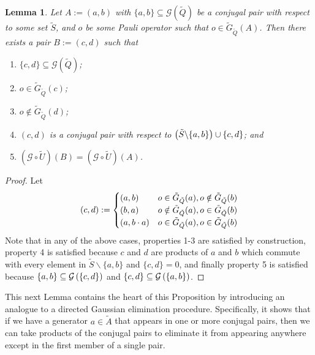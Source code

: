\documentclass[twocolumn,showpacs,preprintnumbers,amsmath,amssymb,nofootinbib,pra,floatfix]{revtex4-1}
\newtheorem{lemma}{Lemma}
\newenvironment{remark}[1][Remark]{\begin{trivlist}
\item[\hskip \labelsep {\bfseries #1}]}{\end{trivlist}}
\newcommand{\set}{\tilde}
\newcommand{\genfun}{\mathcal{G}}
\begin{document}
\begin{lemma}
\label{single-pair-rearrangement}
Let $A:=(a,b)$ with $\{a,b\}\subseteq\genfun(\set Q)$ be a conjugal pair with respect to some set $\set S$, and $o$ be some Pauli operator such that $o\in\set G_{\set Q}(A)$.  Then there exists a pair $B:=(c,d)$ such that
\begin{enumerate}
\item $\{c,d\}\subseteq\genfun(\set Q)$;
\item $o\in \set G_{\set Q}(c)$;
\item $o\notin \set G_{\set Q}(d)$;
\item $(c,d)$ is a conjugal pair with respect to $\paren{\set S\backslash \{a,b\}}\cup\{c,d\}$; and
\item $(\genfun\circ\set U)(B) = (\genfun\circ\set U)(A)$.
\end{enumerate}
\end{lemma}

\begin{proof}
Let
$$
(c,d):=
\begin{cases}
\paren{a,b} & o\in \set G_{\set Q}(a), o\notin \set G_{\set Q}(b) \\
\paren{b,a} &  o\notin \set G_{\set Q}(a), o\in \set G_{\set Q}(b) \\
\paren{a,b\cdot a} & o\in \set G_{\set Q}(a), o\in \set G_{\set Q}(b) \\
\end{cases}
$$
Note that in any of the above cases, properties 1-3 are satisfied by construction, property 4 is satisfied because $c$ and $d$ are products of $a$ and $b$ which commute with every element in $\set S\backslash \{a,b\}$ and $\{c,d\}=0$, and finally property 5 is satisfied because $\{a,b\}\subseteq \genfun\paren{\{c,d\}}$ and $\{c,d\}\subseteq \genfun\paren{\{a,b\}}$.
\end{proof}
\begin{remark}
This next Lemma contains the heart of this Proposition by introducing an analogue to a directed Gaussian elimination procedure.  Specifically, it shows that if we have a generator $a\in\set A$ that appears in one or more conjugal pairs, then we can take products of the conjugal pairs to eliminate it from appearing anywhere except in the first member of a single pair.
\end{remark}
\end{document}
